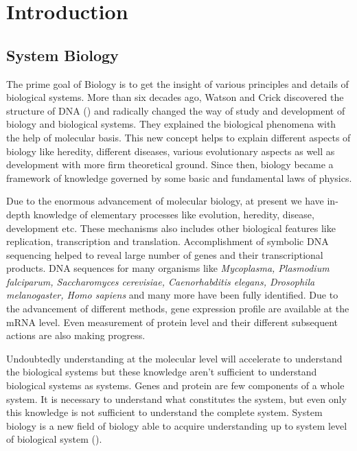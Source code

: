 
\chapter{Introduction} \label{ch:Introduction} %

\ifpdf
    \graphicspath{{Chapter1/Figs/Raster/}{Chapter1/Figs/PDF/}{Chapter1/Figs/}}
\else
    \graphicspath{{Chapter1/Figs/Vector/}{Chapter1/Figs/}}
\fi


\section{System Biology}
The prime goal of Biology is to get the insight of various principles and details of biological systems. More than six decades ago, Watson and Crick discovered the structure of DNA (\cite{Watson:1953}) and radically changed the way of study and development of biology and biological systems. They explained the biological phenomena with the help of molecular basis. This new concept helps to explain different aspects of biology like heredity, different diseases, various evolutionary aspects as well as development with more firm theoretical ground. Since then, biology became a framework of knowledge governed by some basic and fundamental laws of physics.

Due to the enormous advancement of molecular biology, at present we have in-depth knowledge of elementary processes like evolution, heredity, disease, development etc. These mechanisms also includes other biological features like replication, transcription and translation. Accomplishment of symbolic DNA sequencing helped to reveal large number of genes and their transcriptional products. DNA sequences for many organisms like \textit{Mycoplasma, Plasmodium falciparum, Saccharomyces cerevisiae, \textit{Caenorhabditis elegans}, Drosophila melanogaster, Homo sapiens} and many more have been fully identified. Due to the advancement of different methods, gene expression profile are available at the mRNA level. Even measurement of protein level and their different subsequent actions are also making progress. 

Undoubtedly understanding at the molecular level will accelerate to understand the biological systems but these knowledge aren't sufficient to understand biological systems as systems. Genes and protein are few components of a whole system. It is necessary to understand what constitutes the system, but even only this knowledge is not sufficient to understand the complete system. System biology is a new field of biology able to acquire understanding up to system level of biological system (\cite{Kitano:2000}). 


